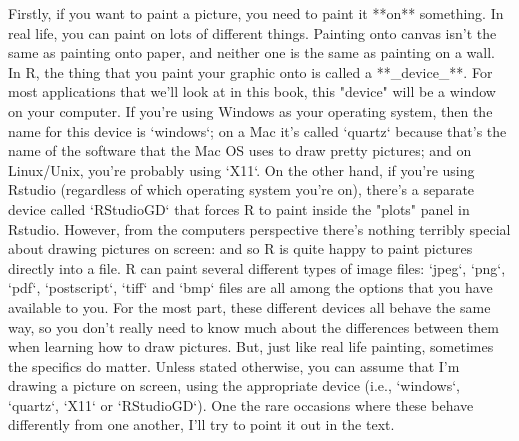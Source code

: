 Firstly, if you want to paint a picture, you need to paint it **on** something. In real life, you can paint on lots of different things. Painting onto canvas isn't the same as painting onto paper, and neither one is the same as painting on a wall. In R, the thing that you paint your graphic onto is called a **_device_**. For most applications that we'll look at in this book, this "device" will be a window on your computer. If you're using Windows as your operating system, then the name for this device is `windows`; on a Mac it's called `quartz` because that's the name of the software that the Mac OS uses to draw pretty pictures; and on Linux/Unix, you're probably using `X11`. On the other hand, if you're using Rstudio (regardless of which operating system you're on), there's a separate device called `RStudioGD` that forces R to paint inside the "plots" panel in Rstudio. However, from the computers perspective there's nothing terribly special about drawing pictures on screen: and so R is quite happy to paint pictures directly into a file. R can paint several different types of image files: `jpeg`, `png`, `pdf`, `postscript`, `tiff` and `bmp` files are all among the options that you have available to you. For the most part, these different devices all behave the same way, so you don't really need to know much about the differences between them when learning how to draw pictures. But, just like real life painting, sometimes the specifics do matter. Unless stated otherwise, you can assume that I'm drawing a picture on screen, using the appropriate device (i.e., `windows`, `quartz`, `X11` or `RStudioGD`). One the rare occasions where these behave differently from one another, I'll try to point it out in the text. 

